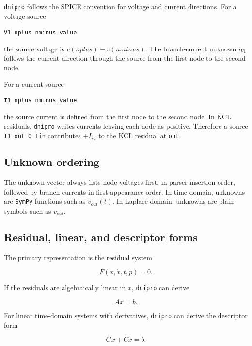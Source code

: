 \documentclass[11pt,a4paper]{article}
\newcommand{\project}{\texttt{dnipro}}
\newcommand{\code}[1]{\texttt{#1}}
\newcommand{\sympy}{\texttt{SymPy}}
\begin{document}
\project{} follows the SPICE convention for voltage and current directions.
For a voltage source

\begin{lstlisting}[style=spice]
V1 nplus nminus value
\end{lstlisting}

the source voltage is \(v(nplus)-v(nminus)\). The branch-current unknown
\(i_{V1}\) follows the current direction through the source from the first node
to the second node.

For a current source

\begin{lstlisting}[style=spice]
I1 nplus nminus value
\end{lstlisting}

the source current is defined from the first node to the second node. In KCL
residuals, \project{} writes currents leaving each node as positive. Therefore a
source \code{I1 out 0 Iin} contributes \(+I_{in}\) to the KCL residual at
\code{out}.

\subsection{Unknown ordering}

The unknown vector always lists node voltages first, in parser insertion order,
followed by branch currents in first-appearance order. In time domain, unknowns
are \sympy{} functions such as \(v_{out}(t)\). In Laplace domain, unknowns are
plain symbols such as \(v_{out}\).

\subsection{Residual, linear, and descriptor forms}

The primary representation is the residual system

\begin{equation}
    F(x,\dot{x},t,p)=0.
\end{equation}

If the residuals are algebraically linear in \(x\), \project{} can derive

\begin{equation}
    A x = b.
\end{equation}

For linear time-domain systems with derivatives, \project{} can derive the
descriptor form

\begin{equation}
    Gx + C\dot{x} = b.
\end{equation}
\end{document}
